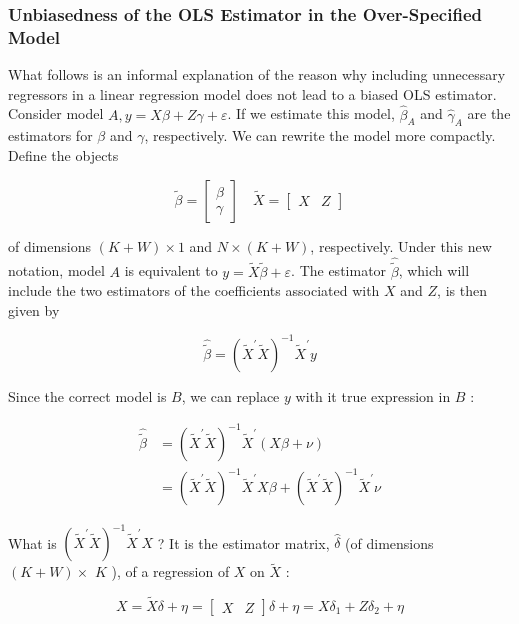 \subsubsection{Unbiasedness of the OLS Estimator in the Over-Specified Model}
What follows is an informal explanation of the reason why including unnecessary regressors in a linear regression model does not lead to a biased OLS estimator. Consider model $A, y=X \beta+Z \gamma+\varepsilon$. If we estimate this model, $\widehat{\beta}_{A}$ and $\widehat{\gamma}_{A}$ are the estimators for $\beta$ and $\gamma$, respectively. We can rewrite the model more compactly. Define the objects

$$
\tilde{\beta}=\left[\begin{array}{l}
\beta \\
\gamma
\end{array}\right] \quad \tilde{X}=\left[\begin{array}{ll}
X & Z
\end{array}\right]
$$

of dimensions $(K+W) \times 1$ and $N \times(K+W)$, respectively. Under this new notation, model $A$ is equivalent to $y=\tilde{X} \tilde{\beta}+\varepsilon$. The estimator $\widehat{\tilde{\beta}}$, which will include the two estimators of the coefficients associated with $X$ and $Z$, is then given by

$$
\widehat{\tilde{\beta}}=\left(\tilde{X}^{\prime} \tilde{X}\right)^{-1} \tilde{X}^{\prime} y
$$

Since the correct model is $B$, we can replace $y$ with it true expression in $B$ :

$$
\begin{aligned}
\widehat{\tilde{\beta}} & =\left(\tilde{X}^{\prime} \tilde{X}\right)^{-1} \tilde{X}^{\prime}(X \beta+\nu) \\
& =\left(\tilde{X}^{\prime} \tilde{X}\right)^{-1} \tilde{X}^{\prime} X \beta+\left(\tilde{X}^{\prime} \tilde{X}\right)^{-1} \tilde{X}^{\prime} \nu
\end{aligned}
$$

What is $\left(\tilde{X}^{\prime} \tilde{X}\right)^{-1} \tilde{X}^{\prime} X$ ? It is the estimator matrix, $\widehat{\delta}$ (of dimensions $(K+W) \times$ $K$ ), of a regression of $X$ on $\tilde{X}$ :

$$
X=\tilde{X} \delta+\eta=\left[\begin{array}{ll}
X & Z
\end{array}\right] \delta+\eta=X \delta_{1}+Z \delta_{2}+\eta
$$

